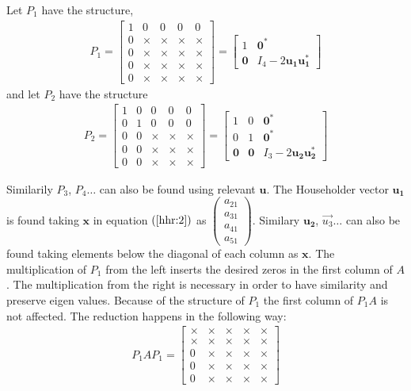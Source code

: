 \documentclass[12pt]{article}
\numberwithin{equation}{section}
\newcommand{\vecb}[1]{\mathbf{#1}}
\newcommand{\brak}[1]{\ensuremath{\left(#1\right)}}
\begin{document}
Let $P_1$ have the structure,
\begin{align}
P_1 = \begin{bmatrix}
1 & 0 & 0 & 0 & 0\\    
0 & \times & \times & \times & \times\\
0 & \times & \times & \times & \times\\
0 & \times & \times & \times & \times\\
0 & \times & \times & \times & \times
\end{bmatrix} = \begin{bmatrix}
1 & \vecb{0}^{\ast}\\    
\vecb{0} & I_4 - 2\vecb{u_1}\vecb{u_1^{\ast}}
\end{bmatrix}
\end{align}
and let $P_2$ have the structure
\begin{align}
P_2 = \begin{bmatrix}
1 & 0 & 0 & 0 & 0\\    
0 & 1 & 0 & 0 & 0\\
0 & 0 & \times & \times & \times\\
0 & 0 & \times & \times & \times\\
0 & 0 & \times & \times & \times
\end{bmatrix} = \begin{bmatrix}
1 & 0 & \vecb{0}^{\ast}\\    
0 & 1 & \vecb{0}^{\ast}\\
\vecb{0} & \vecb{0} & I_3 - 2\vecb{u_2}\vecb{u_2^{\ast}}
\end{bmatrix}
\end{align}

Similarily $P_3$, $P_4 \dots$ can also be found using relevant $\vecb{u}$.
The Householder vector $\vecb{u_1}$ is found taking $\vecb{x}$ in equation \brak{\ref{hhr:2}} as $\begin{pmatrix}a_{21}\\a_{31}\\a_{41}\\a_{51}\end{pmatrix}$.
\newline
Similary $\vecb{u_2}$, $\vec{u_3} \dots$ can also be found taking elements below the diagonal of each column as $\vecb{x}$.
\newline
The multiplication of $P_1$ from the left inserts the desired zeros in the first column of $A$. The multiplication from the right is necessary in order to have similarity and preserve eigen values.
Because of the structure of $P_1$ the first column of $P_1 A$ is not affected.
The reduction happens in the following way:
\begin{align}
P_1 A P_1 = \begin{bmatrix}
\times & \times & \times & \times & \times\\
\times & \times & \times & \times & \times\\
0 & \times & \times & \times & \times\\
0 & \times & \times & \times & \times\\
0 & \times & \times & \times & \times
\end{bmatrix} 
\end{align}
\end{document}
